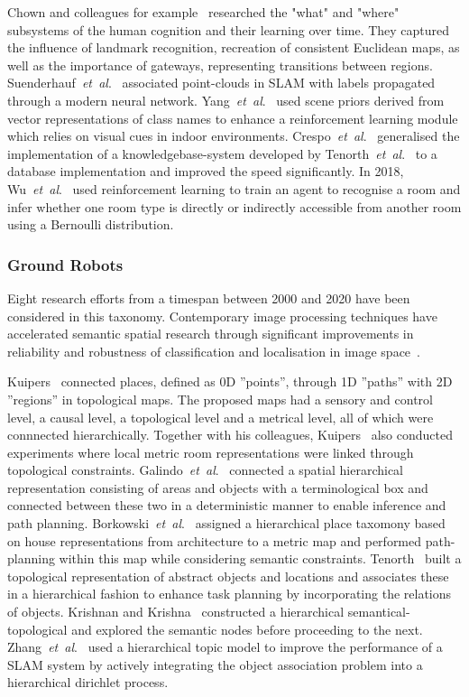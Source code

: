 \documentclass[twocolumn,letterpaper]{IEEEAerospaceCLS}  %
\newcommand{\abbreviation}[1]{\emph{#1}.}
\newcommand{\etal}{\abbreviation{et~al}}
\begin{document}
Chown and colleagues for example~\cite{chown_prototypes_1995} researched the "what" and "where" subsystems of the human cognition and their learning over time. They captured the influence of landmark recognition, recreation of consistent Euclidean maps, as well as the importance of gateways, representing transitions between regions. Suenderhauf~\etal~\cite{sunderhauf_meaningful_2017} associated point-clouds in SLAM with labels propagated through a modern neural network. Yang~\etal~\cite{yang_visual_2018} used scene priors derived from vector representations of class names to enhance a reinforcement learning module which relies on visual cues in indoor environments. Crespo~\etal~\cite{crespo_reasoning_2018} generalised the implementation of a knowledgebase-system developed by Tenorth~\etal~\cite{tenorth_knowrob-map_2010} to a database implementation and improved the speed significantly. In 2018, Wu~\etal~\cite{wu_learning_2018} used reinforcement learning to train an agent to recognise a room and infer whether one room type is directly or indirectly accessible from another room using a Bernoulli distribution.
\subsubsection{Ground Robots} \label{sssec:LitResGro}
Eight research efforts from a timespan between 2000 and 2020 have been considered in this taxonomy. Contemporary image processing techniques have accelerated semantic spatial research through significant improvements in reliability and robustness of classification and localisation in image space~\cite{alom_history_2018}.

Kuipers~\cite{kuipers_spatial_2000} connected places, defined as 0D ''points'', through 1D ''paths'' with 2D ''regions'' in topological maps. The proposed maps had a sensory and control level, a causal level, a topological level and a metrical level, all of which were connnected hierarchically. Together with his colleagues, Kuipers~\cite{kuipers_local_2004} also conducted experiments where local metric room representations were linked through topological constraints. Galindo~\etal~\cite{galindo_robot_2008} connected a spatial hierarchical representation consisting of areas and objects with a terminological box and connected between these two in a deterministic manner to enable inference and path planning. Borkowski~\etal~\cite{borkowski_towards_2010} assigned a hierarchical place taxomony based on house representations from architecture to a metric map and performed path-planning within this map while considering semantic constraints. Tenorth~\cite{tenorth_knowrob-map_2010} built a topological representation of abstract objects and locations and associates these in a hierarchical fashion to enhance task planning by incorporating the relations of objects. Krishnan and Krishna~\cite{krishnan_visual_2010} constructed a hierarchical semantical-topological and explored the semantic nodes before proceeding to the next. Zhang~\etal~\cite{zhang_hierarchical_2019} used a hierarchical topic model to improve the performance of a SLAM system by actively integrating the object association problem into a hierarchical dirichlet process.
\end{document}
